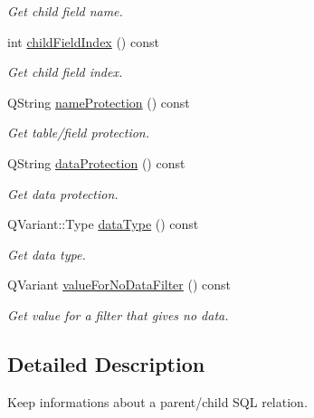 \begin{DoxyCompactItemize}
\begin{DoxyCompactList}\small\item\em Get child field name. \end{DoxyCompactList}\item 
\hypertarget{classmdt_sql_relation_item_a89f5e403c31df53c56ddfc4448d8b91d}{
int \hyperlink{classmdt_sql_relation_item_a89f5e403c31df53c56ddfc4448d8b91d}{childFieldIndex} () const }
\label{classmdt_sql_relation_item_a89f5e403c31df53c56ddfc4448d8b91d}

\begin{DoxyCompactList}\small\item\em Get child field index. \end{DoxyCompactList}\item 
QString \hyperlink{classmdt_sql_relation_item_a2aa445cebd77d6ce707b318f25cc709c}{nameProtection} () const 
\begin{DoxyCompactList}\small\item\em Get table/field protection. \end{DoxyCompactList}\item 
QString \hyperlink{classmdt_sql_relation_item_a46f16fdee2f8fba86ed82e7f7194751b}{dataProtection} () const 
\begin{DoxyCompactList}\small\item\em Get data protection. \end{DoxyCompactList}\item 
\hypertarget{classmdt_sql_relation_item_a8df1470c61b71ade740266b528f7b9a3}{
QVariant::Type \hyperlink{classmdt_sql_relation_item_a8df1470c61b71ade740266b528f7b9a3}{dataType} () const }
\label{classmdt_sql_relation_item_a8df1470c61b71ade740266b528f7b9a3}

\begin{DoxyCompactList}\small\item\em Get data type. \end{DoxyCompactList}\item 
QVariant \hyperlink{classmdt_sql_relation_item_a3d2e24b35c88b246dac2a825019f037b}{valueForNoDataFilter} () const 
\begin{DoxyCompactList}\small\item\em Get value for a filter that gives no data. \end{DoxyCompactList}\end{DoxyCompactItemize}


\subsection{Detailed Description}
Keep informations about a parent/child SQL relation. 

